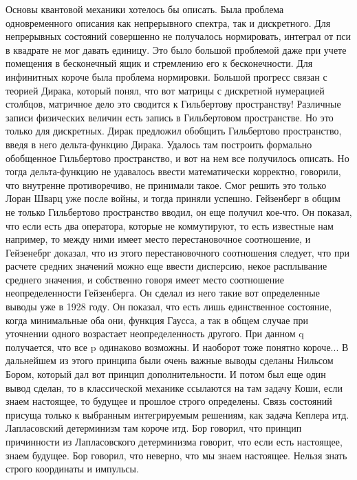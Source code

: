 \documentclass[a4paper, 12pt]{article}
\begin{document}
Основы квантовой механики хотелось бы описать. Была проблема 
одновременного описания как непрерывного спектра, так и дискретного. Для 
непрерывных состояний совершенно не получалось нормировать, интеграл от 
пси в квадрате не мог давать единицу. Это было большой проблемой даже 
при учете помещения в бесконечный ящик и стремлению его к бесконечности. 
Для инфинитных короче была проблема нормировки. Большой прогресс связан 
с теорией Дирака, который понял, что вот матрицы с дискретной нумерацией 
столбцов, матричное дело это сводится к Гильбертову пространству! 
Различные записи физических величин есть запись в Гильбертовом 
пространстве. Но это только для дискретных. Дирак предложил обобщить 
Гильбертово пространство, введя в него дельта-функцию Дирака. Удалось 
там построить формально обобщенное Гильбертово пространство, и вот на 
нем все получилось описать. Но тогда дельта-функцию не удавалось ввести 
математически корректно, говорили, что внутренне противоречиво, не 
принимали такое. Смог решить это только Лоран Шварц уже после войны, 
и тогда приняли успешно. Гейзенберг в общим не только Гильбертово 
пространство вводил, он еще получил кое-что. Он показал, что если есть 
два оператора, которые не коммутируют, то есть известные нам например, 
то между ними имеет место перестановочное соотношение, и Гейзенебрг 
доказал, что из этого перестановочного соотношения следует, что при 
расчете средних значений можно еще ввести дисперсию, некое расплывание 
среднего значения, и собственно говоря имеет место соотношение 
неопределенности Гейзенберга. Он сделал из него такие вот определенные 
выводы уже в 1928 году. Он показал, что есть лишь единственное 
состояние, когда минимальные оба они, функция Гаусса, а так в общем 
случае при уточнении одного возрастает неопределенность другого. При 
данном q получается, что все p одинаково возможны. И наоборот тоже 
понятно короче... В дальнейшем из этого принципа были очень важные 
выводы сделаны Нильсом Бором, который дал вот принцип дополнительности. 
И потом был еще один вывод сделан, то в классической механике ссылаются 
на там задачу Коши, если знаем настоящее, то будущее и прошлое строго 
определены. Связь состояний присуща только к выбранным интегрируемым 
решениям, как задача Кеплера итд. Лапласовский детерминизм там короче 
итд. Бор говорил, что принцип причинности из Лапласовского детерминизма 
говорит, что если есть настоящее, знаем будущее. Бор говорил, что 
неверно, что мы знаем настоящее. Нельзя знать строго координаты 
и импульсы.
\end{document}
